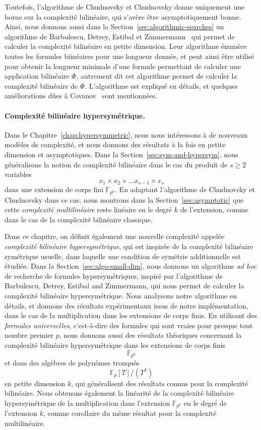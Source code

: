 Toutefois, l'algorithme de Chudnovsky et Chudnovsky donne uniquement une borne
sur la complexité bilinéaire, qui s'avère être asymptotiquement bonne. Ainsi,
nous donnons aussi dans la Section~\ref{sec:algorithmic-searches} un algorithme
de Barbulescu, Detrey, Estibal et Zimmermann~\cite{BDEZ12} qui permet de
calculer la complexité bilinéaire en petite dimension. Leur algorithme énumère
toutes les formules biinéaires pour une longueur donnée, et peut ainsi être
utilisé pour obtenir la longueur minimale d'une formule permettant de calculer
une application bilinéaire $\Phi$, autrement dit cet algorithme permet de
calculer la complexité bilinéaire de $\Phi$. L'algorithme est expliqué en
détails, et quelques améliorations dûes à Covanov~\cite{Covanov19} sont
mentionnées.

\paragraph{Complexité bilinéaire hypersymétrique.} Dans le
Chapitre~\ref{chap:hypersymmetric}, nous nous intéressons à de nouveaux modèles
de complexité, et nous donnons des résultats à la fois en petite dimension et
asymptotiques. Dans la Section~\ref{sec:sym-and-hypersym}, nous généralisons
la notion de complexité bilinéaire dans le cas du produit de $s\geq2$ variables
\[
  x_1\times x_2 \times\dots x_{s-1}\times x_s
\]
dans une extension de corps fini $\mathbb{F}_{p^{k}}$. En adaptant l'algorithme
de Chudnovsky et Chudnovsky dans ce cas, nous montrons dans la
Section~\ref{sec:asymptotic} que cette \emph{complexité multilinéaire} reste
linéaire en le degré $k$ de l'extension, comme dans le cas de la complexité
bilinéaire classique.

Dans ce chapitre, on définit également une nouvelle complexité appelée
\emph{complexité bilinéaire hypersymétrique}, qui est inspirée de la complexité
bilinéaire symétrique usuelle, dans laquelle une condition de symétrie
additionnelle est étudiée. Dans la Section~\ref{sec:algo-small-dim}, nous
donnons un algorithme \emph{ad hoc} de recherche
de formules hypersymétriques, inspiré par l'algorithme de Barbulescu, Detrey,
Estibal and Zimmermann, qui nous permet de calculer la complexité bilinéaire
hypersymétrique. Nous analysons notre algorithme en détails, et donnons des
résultats expérimentaux issus de notre implémentation, dans le cas de la
multiplication dans les extensions de corps finis. En utilisant des
\emph{formules universelles}, c'est-à-dire des formules qui sont vraies pour
presque tout nombre premier $p$, nous donnons aussi des résultats théoriques
concernant la complexité bilinéaire hypersymétrique dans les extensions de corps
finis
\[
  \mathbb{F}_{p^{k}}
\]
et dans des algèbres de polynômes tronqués
\[
  \mathbb{F}_p[T]/(T^k)
\]
en petite dimension $k$, qui généralisent des résultats connus pour la
complexité bilinéaire. Nous obtenons également la linéarité de la complexité
bilinéaire hypersymétrique de la multiplication dans l'extension
$\mathbb{F}_{p^{k}}$ en le degré de l'extension $k$, comme corollaire du même
résultat pour la complexité multilinéaire.

